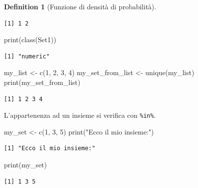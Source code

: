 \documentclass[
  letterpaper,
  DIV=11,
  numbers=noendperiod,
  oneside]{scrreprt}
\newenvironment{Shaded}{\begin{snugshade}}{\end{snugshade}}
\newcommand{\DecValTok}[1]{\textcolor[rgb]{0.68,0.00,0.00}{#1}}
\newcommand{\FunctionTok}[1]{\textcolor[rgb]{0.28,0.35,0.67}{#1}}
\newcommand{\NormalTok}[1]{\textcolor[rgb]{0.00,0.23,0.31}{#1}}
\newcommand{\OtherTok}[1]{\textcolor[rgb]{0.00,0.23,0.31}{#1}}
\newcommand{\StringTok}[1]{\textcolor[rgb]{0.13,0.47,0.30}{#1}}
\theoremstyle{definition}
\theoremstyle{plain}
\theoremstyle{definition}
\newtheorem{definition}{Definition}[chapter]
\theoremstyle{remark}
\begin{document}
\begin{definition}[Funzione di densità di
probabilità]
\begin{verbatim}
[1] 1 2
\end{verbatim}

\begin{Shaded}
\begin{Highlighting}[]
\FunctionTok{print}\NormalTok{(}\FunctionTok{class}\NormalTok{(Set1))}
\end{Highlighting}
\end{Shaded}

\begin{verbatim}
[1] "numeric"
\end{verbatim}

\begin{Shaded}
\begin{Highlighting}[]
\NormalTok{my\_list }\OtherTok{\textless{}{-}} \FunctionTok{c}\NormalTok{(}\DecValTok{1}\NormalTok{, }\DecValTok{2}\NormalTok{, }\DecValTok{3}\NormalTok{, }\DecValTok{4}\NormalTok{)}
\NormalTok{my\_set\_from\_list }\OtherTok{\textless{}{-}} \FunctionTok{unique}\NormalTok{(my\_list)}
\FunctionTok{print}\NormalTok{(my\_set\_from\_list)}
\end{Highlighting}
\end{Shaded}

\begin{verbatim}
[1] 1 2 3 4
\end{verbatim}

L'appartenenza ad un insieme si verifica con \texttt{\%in\%}.

\begin{Shaded}
\begin{Highlighting}[]
\NormalTok{my\_set }\OtherTok{\textless{}{-}} \FunctionTok{c}\NormalTok{(}\DecValTok{1}\NormalTok{, }\DecValTok{3}\NormalTok{, }\DecValTok{5}\NormalTok{)}
\FunctionTok{print}\NormalTok{(}\StringTok{"Ecco il mio insieme:"}\NormalTok{)}
\end{Highlighting}
\end{Shaded}

\begin{verbatim}
[1] "Ecco il mio insieme:"
\end{verbatim}

\begin{Shaded}
\begin{Highlighting}[]
\FunctionTok{print}\NormalTok{(my\_set)}
\end{Highlighting}
\end{Shaded}

\begin{verbatim}
[1] 1 3 5
\end{verbatim}


\end{definition}
\end{document}
